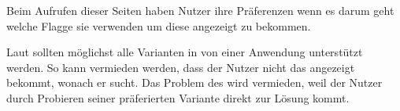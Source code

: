 \documentclass[oneside,bibliography=totocnumbered,BCOR=5mm]{scrbook}
\newenvironment{code}{\captionsetup{type=listing, skip=0pt}}{}
\begin{document}
Beim Aufrufen dieser Seiten haben Nutzer ihre Präferenzen wenn es darum geht
welche Flagge sie verwenden um diese angezeigt zu bekommen.

\begin{code}
  \medskip
\end{code}

Laut \textcite{12factor} sollten möglichst alle Varianten in von einer Anwendung
unterstützt werden. So kann vermieden werden, dass der Nutzer nicht das
angezeigt bekommt, wonach er sucht. Das Problem des  wird vermieden, weil
der Nutzer durch Probieren seiner präferierten Variante direkt zur Lösung kommt.

\end{document}
